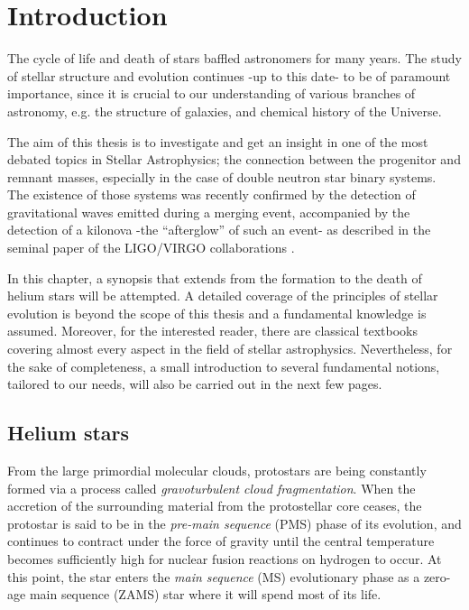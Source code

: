 \documentclass[../../main/thesis_msc.tex]{subfiles}
\begin{document}
    \chapter{Introduction}
    
		The cycle of life and death of stars  baffled astronomers for many years. The study of stellar structure and evolution continues -up to this date- to be of paramount importance, since it is crucial to our understanding of various branches of astronomy, e.g. the structure of galaxies, and chemical history of the Universe.
		
		The aim of this thesis is to investigate and get an insight in one of the most debated topics in Stellar Astrophysics; the connection between the progenitor and remnant masses, especially in the case of double neutron star binary systems. The existence of those systems was recently confirmed by the detection of gravitational waves emitted during a merging event, accompanied by the detection of a kilonova -the ``afterglow'' of such an event- as described in the seminal paper of the LIGO/VIRGO collaborations \citep{ligo}.
		
		In this chapter, a synopsis that extends from the formation to the death of helium stars will be attempted. A detailed coverage of the principles of stellar evolution is beyond the scope of this thesis and a fundamental knowledge is assumed. Moreover, for the interested reader, there are classical textbooks \citep{Kipp_book, Clayton, Prialnik, Eggleton_book} covering almost every aspect in the field of stellar astrophysics. Nevertheless, for the sake of completeness, a small introduction to several fundamental notions, tailored to our needs, will also be carried out in the next few pages. 
		

    
    
    \section{Helium stars}
    	
    	From the large primordial molecular clouds, protostars are being constantly formed via a process called \emph{gravoturbulent cloud fragmentation}. When the accretion of the surrounding material from the protostellar core ceases, the protostar is said to be in the \emph{pre-main sequence} (PMS) phase of its evolution, and continues to contract under the force of gravity until the central temperature becomes sufficiently high for nuclear fusion reactions on hydrogen to occur. At this point, the star enters the \emph{main sequence} (MS) evolutionary phase as a zero-age main sequence (ZAMS) star where it will spend most of its life.
    	
\end{document}
